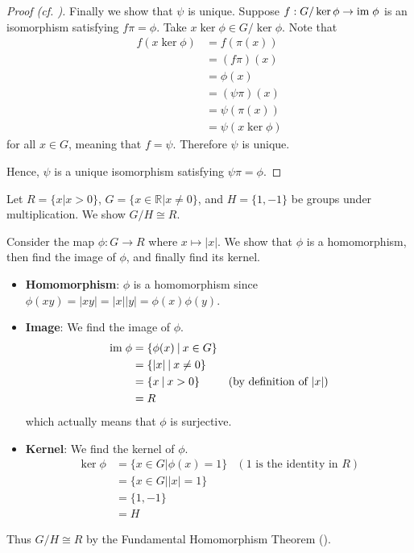 \begin{proof}[Proof (cf. {\cite[p.~250, Theorem 2]{cohn_1982}})]
    Finally we show that $\psi$ is unique. Suppose $f: G/\ker\phi \to \mathrm{im}\;\phi$ is an isomorphism satisfying $f\pi=\phi$. Take $x\ker\phi \in G/\ker\phi$. Note that
    \begin{align*}
        f(x\ker\phi) &= f(\pi(x))\\
        &= (f\pi)(x)\\
        &= \phi(x)\\
        &= (\psi\pi)(x)\\
        &= \psi(\pi(x))\\
        &= \psi(x\ker\phi)
    \end{align*}
    for all $x \in G$, meaning that $f = \psi$. Therefore $\psi$ is unique.

    Hence, $\psi$ is a unique isomorphism satisfying $\psi\pi = \phi$.
\end{proof}

\begin{example}
    Let $R = \{x \vert x > 0\}$, $G = \{x \in \mathbb{R} \vert x \neq 0\}$, and $H = \{1, -1\}$ be groups under multiplication. We show $G / H \cong R$.

    Consider the map $\phi: G \to R$ where $x \mapsto |x|$. We show that $\phi$ is a homomorphism, then find the image of $\phi$, and finally find its kernel.
    \begin{itemize}
        \item \textbf{Homomorphism}: $\phi$ is a homomorphism since $\phi(xy) = |xy| = |x||y| = \phi(x)\phi(y)$.
        \item \textbf{Image}: We find the image of $\phi$.
        \begin{align*}
            \im\phi &= \{\phi(x) \vert x \in G\}\\
            &= \{|x| \vert x \neq 0\}\\
            &= \{x \vert x > 0\} & (\text{by definition of } |x|)\\
            &= R
        \end{align*}
        which actually means that $\phi$ is surjective.
        \item \textbf{Kernel}: We find the kernel of $\phi$.
        \begin{align*}
            \ker\phi &= \{x \in G \vert \phi(x) = 1\} & (1 \text{ is the identity in } R)\\
            &= \{x \in G \vert |x| = 1\}\\
            &= \{1, -1\}\\
            &= H
        \end{align*}
    \end{itemize}
    Thus $G/H \cong R$ by the Fundamental Homomorphism Theorem ().
\end{example}

